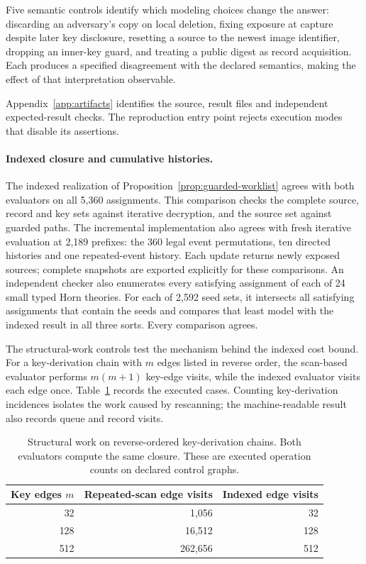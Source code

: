 \documentclass[pdflatex]{sn-jnl}
\theoremstyle{thmstyleone}
\theoremstyle{thmstylethree}
\theoremstyle{thmstyletwo}
\begin{document}
Five semantic controls identify which modeling choices change the answer:
discarding an adversary's copy on local deletion, fixing exposure at capture
despite later key disclosure, resetting a source to the newest image
identifier, dropping an inner-key guard, and treating a public digest as
record acquisition. Each produces a specified disagreement with the
declared semantics, making the effect of that interpretation observable.

Appendix~\ref{app:artifacts} identifies the source, result files and
independent expected-result checks. The reproduction entry point rejects
execution modes that disable its assertions.

\paragraph{Indexed closure and cumulative histories.}
The indexed realization of Proposition~\ref{prop:guarded-worklist} agrees
with both evaluators on all 5,360 assignments. This comparison
checks the complete source, record and key sets against iterative decryption,
and the source set against guarded paths. The incremental implementation
also agrees with fresh iterative evaluation at 2,189 prefixes: the 360 legal
event permutations, ten directed histories and one repeated-event history.
Each update returns newly exposed sources; complete snapshots are exported
explicitly for these comparisons.
An independent checker also enumerates every satisfying assignment of each
of 24 small typed Horn theories. For each of 2,592 seed sets, it intersects
all satisfying assignments that contain the seeds and compares that least
model with the indexed result in all three sorts. Every comparison agrees.

The structural-work controls test the mechanism behind the indexed cost
bound. For a key-derivation chain with $m$ edges listed in reverse order,
the scan-based evaluator performs $m(m+1)$ key-edge visits, while the indexed
evaluator visits each edge once. Table~\ref{tab:indexed-key-work} records
the executed cases. Counting key-derivation incidences isolates the work
caused by rescanning; the machine-readable result also records queue and
record visits.

\begin{table}[t]
\centering
\small
\begin{tabular}{@{}rrr@{}}
\toprule
Key edges $m$ & Repeated-scan edge visits & Indexed edge visits\\
\midrule
32 & 1,056 & 32\\
128 & 16,512 & 128\\
512 & 262,656 & 512\\
\bottomrule
\end{tabular}
\caption{Structural work on reverse-ordered key-derivation chains.
Both evaluators compute the same closure. These are executed operation
counts on declared control graphs.}
\label{tab:indexed-key-work}
\end{table}
\end{document}
